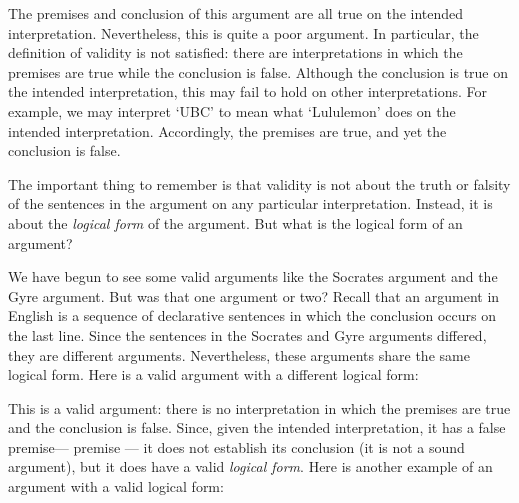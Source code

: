 \begin{earg}
\end{earg}

The premises and conclusion of this argument are all true on the intended interpretation.
Nevertheless, this is quite a poor argument.
In particular, the definition of validity is not satisfied: there are interpretations in which the premises are true while the conclusion is false.
Although the conclusion is true on the intended interpretation, this may fail to hold on other interpretations.
For example, we may interpret `UBC' to mean what `Lululemon' does on the intended interpretation.
Accordingly, the premises are true, and yet the conclusion is false.

The important thing to remember is that validity is not about the truth or falsity of the sentences in the argument on any particular interpretation. 
Instead, it is about the \textit{logical form} of the argument.
But what is the logical form of an argument?

We have begun to see some valid arguments like the Socrates argument and the Gyre argument.
But was that one argument or two?
Recall that an argument in English is a sequence of declarative sentences in which the conclusion occurs on the last line.
Since the sentences in the Socrates and Gyre arguments differed, they are different arguments.
Nevertheless, these arguments share the same logical form.
Here is a valid argument with a different logical form:

\begin{earg} \label{ch00:fruit}
\end{earg}

This is a valid argument: there is no interpretation in which the premises are true and the conclusion is false.
Since, given the intended interpretation, it has a false premise--- premise --- it does not establish its conclusion (it is not a sound argument), but it does have a valid \emph{logical form}.
Here is another example of an argument with a valid logical form:

\begin{earg}
\end{earg}

